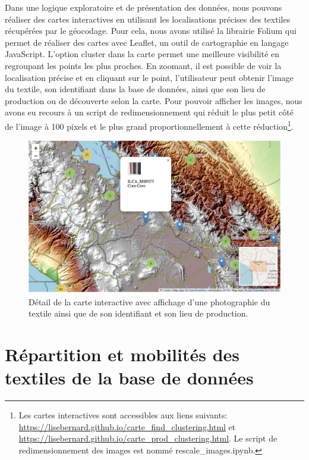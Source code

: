 Dans une logique exploratoire et de présentation des données, nous pouvons réaliser des cartes interactives en utilisant les localisations précises des textiles récupérées par le géocodage. Pour cela, nous avons utilisé la librairie Folium qui permet de réaliser des cartes avec Leaflet, un outil de cartographie en langage JavaScript. L'option \og cluster \fg \: dans la carte permet une meilleure visibilité en regroupant les points les plus proches. En zoomant, il est possible de voir la localisation précise et en cliquant sur le point, l'utilisateur peut obtenir l'image du textile, son identifiant dans la base de données, ainsi que son lieu de production ou de découverte selon la carte.
Pour pouvoir afficher les images, nous avons eu recours à un script de redimensionnement qui réduit le plus petit côté de l'image à 100 pixels et le plus grand proportionnellement à cette réduction\footnote{Les cartes interactives sont accessibles aux liens suivants: \url{https://lisebernard.github.io/carte_find_clustering.html} et \url{https://lisebernard.github.io/carte_prod_clustering.html}. Le script de redimensionnement des images est nommé rescale\_images.ipynb.}.

\begin{figure}[!h]
	\begin{center}
		\includegraphics[width=12cm]{../images/carte_leaflet2.png}
		\caption{Détail de la carte interactive avec affichage d'une photographie du textile ainsi que de son identifiant et son lieu de production.}
		\label{fig:leaflet}
	 \end{center}
\end{figure}

\clearpage


\section{Répartition et mobilités des textiles de la base de données}

